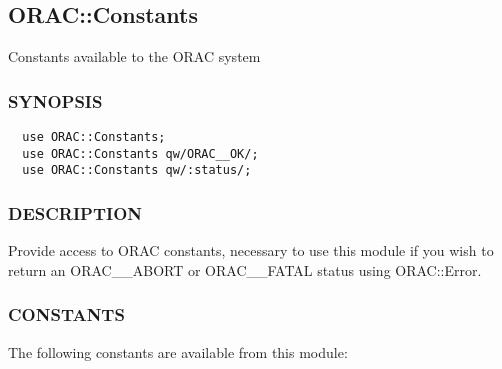 \subsection{ORAC::Constants\label{ORAC::Constants}}


Constants available to the ORAC system

\subsubsection*{SYNOPSIS\label{ORAC::Constants_SYNOPSIS}}
\begin{verbatim}
  use ORAC::Constants;
  use ORAC::Constants qw/ORAC__OK/;
  use ORAC::Constants qw/:status/;
\end{verbatim}
\subsubsection*{DESCRIPTION\label{ORAC::Constants_DESCRIPTION}}


Provide access to ORAC constants, necessary to use this module if you wish
to return an ORAC\_\_ABORT or ORAC\_\_FATAL status using ORAC::Error.

\subsubsection*{CONSTANTS\label{ORAC::Constants_CONSTANTS}}


The following constants are available from this module:

